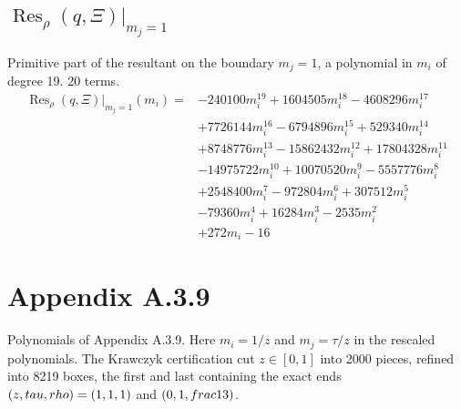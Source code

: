 \subsection*{$\operatorname{Res}_\rho(q,\Xi)|_{m_j=1}$}
Primitive part of the resultant on the boundary $m_j=1$, a polynomial in $m_i$ of degree 19. 20 terms.
{\small
\begin{align*}
\operatorname{Res}_\rho(q,\Xi)|_{m_j=1}(m_i)={}&-240100m_i^{19}+1604505m_i^{18}-4608296m_i^{17}\\
&+7726144m_i^{16}-6794896m_i^{15}+529340m_i^{14}\\
&+8748776m_i^{13}-15862432m_i^{12}+17804328m_i^{11}\\
&-14975722m_i^{10}+10070520m_i^{9}-5557776m_i^{8}\\
&+2548400m_i^{7}-972804m_i^{6}+307512m_i^{5}\\
&-79360m_i^{4}+16284m_i^{3}-2535m_i^{2}\\
&+272m_i-16
\end{align*}
}


\section*{Appendix A.3.9}
Polynomials of Appendix A.3.9. Here $m_i=1/z$ and $m_j=\tau/z$ in the rescaled polynomials. The Krawczyk certification cut $z\in[0,1]$ into 2000 pieces, refined into 8219 boxes, the first and last containing the exact ends $(z,\\tau,\\rho)=(1,1,1)$ and $(0,1,\\frac13)$.

